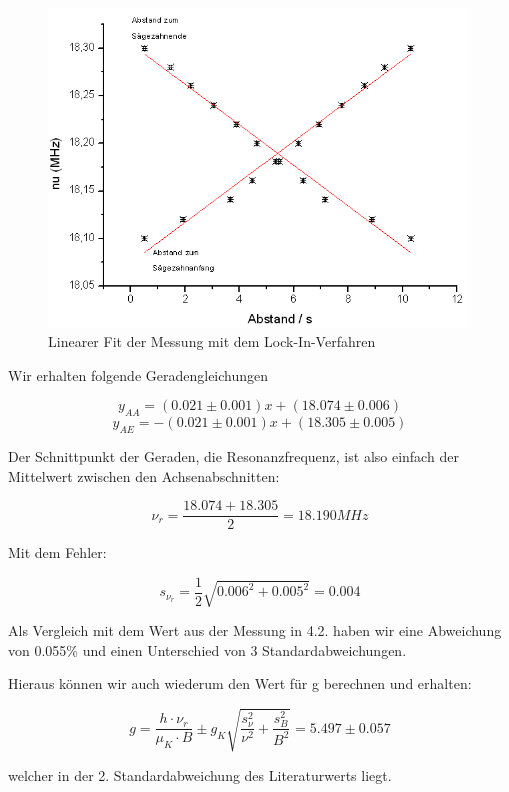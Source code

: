 \begin{figure}[H]
\centering \includegraphics[width=0.99\textwidth]{Bilder/linreg.png}
\caption{Linearer Fit der Messung mit dem Lock-In-Verfahren}
\end{figure}

Wir erhalten folgende Geradengleichungen

$$ y_{AA} = (0.021 \pm 0.001)x + (18.074 \pm 0.006) $$
$$ y_{AE} = -(0.021 \pm 0.001)x + (18.305 \pm 0.005) $$

Der Schnittpunkt der Geraden, die Resonanzfrequenz, ist also einfach der Mittelwert zwischen den Achsenabschnitten:

$$ \boxed{\nu_r = \frac{18.074 + 18.305}{2} = 18.190 MHz} $$

Mit dem Fehler:

$$s_{\nu_r} = \frac{1}{2}\sqrt{0.006^2 + 0.005^2} = 0.004$$

Als Vergleich mit dem Wert aus der Messung in 4.2. haben wir eine Abweichung von 0.055\% und einen Unterschied von 3 Standardabweichungen.

Hieraus können wir auch wiederum den Wert für g berechnen und erhalten:

$$ g = \frac{h\cdot\nu_r}{\mu_K\cdot B} \pm g_K\sqrt{\frac{s_\nu^2}{\nu^2} + \frac{s_B^2}{B^2}} = 5.497 \pm 0.057 $$ 

welcher in der 2. Standardabweichung des Literaturwerts liegt.














